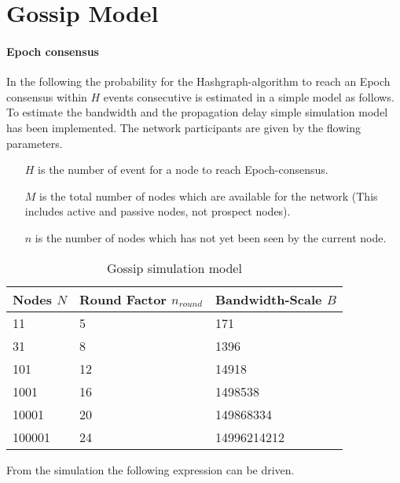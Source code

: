\section{Gossip Model}\label{sec:gossip_model}

\paragraph{Epoch consensus\\}

In the following the probability for the Hashgraph-algorithm to reach an Epoch consensus within $H$ events consecutive is estimated in a simple model as follows.\\

To estimate the bandwidth and the propagation delay simple simulation model has been implemented. 
The network participants are given by the flowing parameters.
\begin{itemize}
	\item[$H$] is the number of event for a node to reach Epoch-consensus.
	\item[$M$] is the total number of nodes which are available for the network (This includes active and passive nodes, not prospect nodes). 
	\item[$n$] is the number of nodes which has not yet been seen by the current node. 
\end{itemize}


\begin{table}[H]
	\begin{center}
		\begin{tabular}{|l|p{4cm}|p{3cm}|}
			\hline
			Nodes $N$ & Round Factor $n_{round}$ & Bandwidth-Scale $B$ \\
			\hline
			11 & 5 & 171 \\
			\hline
			31 & 8 & 1396 \\
			\hline
			101 & 12 & 14918 \\
			\hline
			1001 & 16 & 1498538 \\
			\hline
			10001 & 20 & 149868334 \\
			\hline
			100001 & 24 & 14996214212 \\
			\hline
		\end{tabular}
	\end{center}
	\caption{Gossip simulation model} 
	\label{tab:gossip_model}
\end{table}

From the simulation the following expression can be driven.\\

